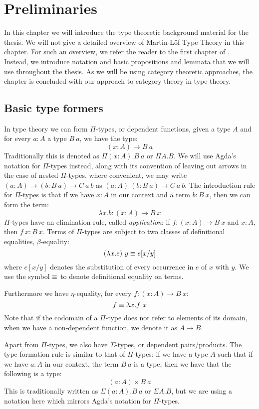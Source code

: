 \chapter{Preliminaries}
\label{prelims}

In this chapter we will introduce the type theoretic background
material for the thesis. We will not give a detailed overview of
Martin-L\"of Type Theory in this chapter. For such an overview, we
refer the reader to the first chapter of \cite{UFP2013}. Instead, we
introduce notation and basic propositions and lemmata that we will use
throughout the thesis. As we will be using category theoretic
approaches, the chapter is concluded with our approach to category
theory in type theory.

\section{Basic type formers}
In type theory we can form $\Pi$-types, or dependent functions, given
a type $A$ and for every $a : A$ a type $B\ a$, we have the type:
$$
(x : A) \to B\ a
$$
Traditionally this is denoted as $\Pi (x : A) . B\ a$ or $\Pi A . B$.
We will use Agda's notation for $\Pi$-types instead, along with its
convention of leaving out arrows in the case of nested $\Pi$-types,
where convenient, \eg we may write
$(a : A) \to (b : B\ a) \to C\ a\ b$ as
$(a : A)\ (b : B\ a) \to C\ a\ b$. The introduction rule for
$\Pi$-types is that if we have $x : A$ in our context and a term
$b : B\ x$, then we can form the term:
$$
\lambda x . b : (x : A) \to B\ x
$$
$\Pi$-types have an elimination rule, called \emph{application}: if
$f : (x : A) \to B\ x$ and $x : A$, then $f\ x : B\ x$. Terms of
$\Pi$-types are subject to two classes of definitional equalities,
$\beta$-equality:
$$
(\lambda x . e)\ y \equiv e[x/y]
$$
where $e[x/y]$ denotes the substitution of every occurrence in $e$ of
$x$ with $y$. We use the symbol $\equiv$ to denote definitional
equality on terms.

Furthermore we have $\eta$-equality, for every $f : (x : A) \to B\ x$:
$$
f \equiv \lambda x . f\ x
$$
Note that if the codomain of a $\Pi$-type does not refer to elements
of its domain, \ie when we have a non-dependent function, we denote it
as $A \to B$.

Apart from $\Pi$-types, we also have $\Sigma$-types, or dependent
pairs/products. The type formation rule is similar to that of
$\Pi$-types: if we have a type $A$ such that if we have $a : A$ in our
context, the term $B\ a$ is a type, then we have that the following is a type:
$$
(a : A) \times B\ a
$$
This is traditionally written as $\Sigma (a : A) . B\ a$ or
$\Sigma A . B$, but we are using a notation here which mirrors Agda's
notation for $\Pi$-types.

